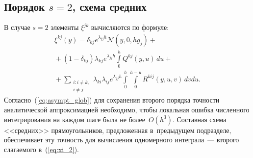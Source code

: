\begin{multicols}{2}
\subsection{Порядок $s=2$, схема средних}

 В случае $s=2$ элементы $\xi^{jk}$ вычисляются по формуле:
 \begin{multline} %
 \xi^{kj}(y)= \delta_{kj}e^{\lambda_{jj}h}\mathcal{N}(y,0,hg_j)+{} \\
{}+ 
 (1-\delta_{kj})\lambda_{kj}e^{\lambda_{jj}h}
 \int\limits_0^h Q^{kj}(y,u)\,du +{}\\
 {}+
 \sum\limits_{\substack{{i:i \neq k,}\\ {i \neq j}}} \lambda_{k 
i}\lambda_{i j} e^{\lambda_{jj}h}
\int\limits_0^{h} \int\limits_0^{h-u}
R^{kij} (y,u,v)\,dvdu.
 \label{eq:xi_2}
 \end{multline}
Согласно~(\ref{eq:asympt_glob}) для сохранения второго порядка точности 
аналитической аппроксимацией необходимо, чтобы локальная ошибка 
численного интегрирования на каждом шаге была не более~$O(h^3)$.\linebreak 
Составная схема <<средних>> прямоугольников, предложенная в~предыдущем 
подразделе, обеспечивает эту точность для вычисления одномерного 
интеграла~--- второго слагаемого в~(\ref{eq:xi_2}).


\end{multicols}
